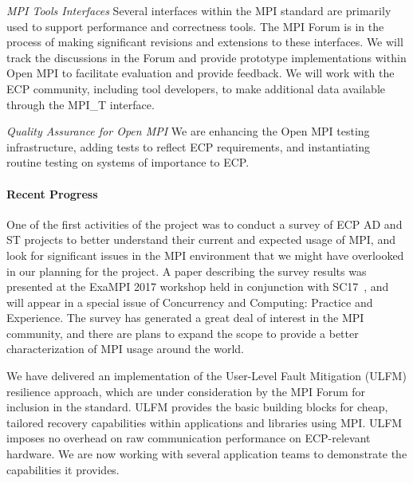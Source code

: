 \emph{MPI Tools Interfaces}  Several interfaces within the
MPI standard are primarily used to support performance and
correctness tools.
The MPI Forum is in the process
of making significant revisions and extensions to these interfaces.
We will track the discussions in the Forum and provide prototype
implementations within Open MPI to facilitate evaluation and provide
feedback.
We will work with the
ECP community, including tool developers, to make additional data
available through the MPI\_T interface.

\emph{Quality Assurance for Open MPI}  We are enhancing the
Open MPI testing infrastructure, adding tests to reflect ECP
requirements, and instantiating routine testing on systems of
importance to ECP.

\paragraph{Recent Progress}
One of the first activities of the project was to conduct a survey of
ECP AD and ST projects to better understand their current and expected
usage of MPI, and look for significant issues in the MPI environment
that we might have overlooked in our planning for the project.  A
paper describing the survey results was presented at the ExaMPI 2017
workshop held in conjunction with SC17~\cite{Bernholdt:2017:smu-talk},
and will appear in a special issue of Concurrency and Computing:
Practice and Experience.  The survey has generated a great deal of
interest in the MPI community, and there are plans to expand the scope
to provide a better characterization of MPI usage around the world.

We have delivered an implementation of the User-Level Fault Mitigation
(ULFM) resilience approach, which are under consideration by the MPI
Forum for inclusion in the standard.  ULFM provides the basic building
blocks for cheap, tailored recovery capabilities within applications
and libraries using MPI.  ULFM imposes no overhead on raw
communication performance on ECP-relevant hardware.  We are now
working with several application teams to demonstrate the capabilities
it provides.

